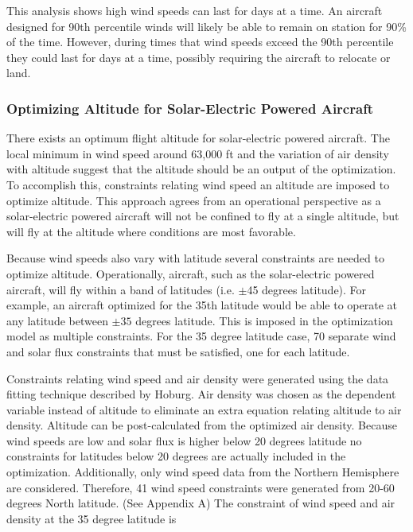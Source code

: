 \documentclass[]{aiaa-tc}%
\begin{document}
This analysis shows high wind speeds can last for days at a time.  
An aircraft designed for 90th percentile winds will likely be able to remain on station for 90\% of the time.  
However, during times that wind speeds exceed the 90th percentile they could last for days at a time, possibly requiring the aircraft to relocate or land. 

\subsubsection{Optimizing Altitude for Solar-Electric Powered Aircraft}

There exists an optimum flight altitude for solar-electric powered aircraft.  
The local minimum in wind speed around 63,000 ft and the variation of air density with altitude suggest that the altitude should be an output of the optimization. 
To accomplish this, constraints relating wind speed an altitude are imposed to optimize altitude. 
This approach agrees from an operational perspective as a solar-electric powered aircraft will not be confined to fly at a single altitude, but will fly at the altitude where conditions are most favorable. 

Because wind speeds also vary with latitude several constraints are needed to optimize altitude. 
Operationally, aircraft, such as the solar-electric powered aircraft, will fly within a band of latitudes (i.e. $\pm$45 degrees latitude).  
For example, an aircraft optimized for the 35th latitude would be able to operate at any latitude between $\pm35$ degrees latitude. 
This is imposed in the optimization model as multiple constraints. For the 35 degree latitude case, 70 separate wind and solar flux constraints that must be satisfied, one for each latitude.

Constraints relating wind speed and air density were generated using the data fitting technique described by Hoburg\cite{fitting}.
Air density was chosen as the dependent variable instead of altitude to eliminate an extra equation relating altitude to air density. 
Altitude can be post-calculated from the optimized air density. 
Because wind speeds are low and solar flux is higher below 20 degrees latitude no constraints for latitudes below 20 degrees are actually included in the optimization. 
Additionally, only wind speed data from the Northern Hemisphere are considered.
Therefore, 41 wind speed constraints were generated from 20-60 degrees North latitude. (See Appendix A) 
The constraint of wind speed and air density at the 35 degree latitude is 
\end{document}
